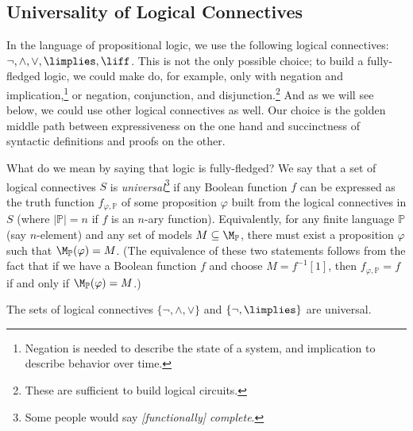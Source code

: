 \subsection{Universality of Logical Connectives}

In the language of propositional logic, we use the following logical connectives: $\neg, \land, \lor, \limplies, \liff$. This is not the only possible choice; to build a fully-fledged logic, we could make do, for example, only with negation and implication,\footnote{Negation is needed to describe the state of a system, and implication to describe behavior over time.} or negation, conjunction, and disjunction.\footnote{These are sufficient to build logical circuits.} And as we will see below, we could use other logical connectives as well. Our choice is the golden middle path between expressiveness on the one hand and succinctness of syntactic definitions and proofs on the other.

What do we mean by saying that logic is fully-fledged? We say that a set of logical connectives $S$ is \emph{universal}\footnote{Some people would say \emph{[functionally] complete}.} if any Boolean function $f$ can be expressed as the truth function $f_{\varphi,\mathbb P}$ of some proposition $\varphi$ built from the logical connectives in $S$ (where $|\mathbb P|=n$ if $f$ is an $n$-ary function). Equivalently, for any finite language $\mathbb P$ (say $n$-element) and any set of models $M \subseteq \M_\mathbb P$, there must exist a proposition $\varphi$ such that $\M_\mathbb P(\varphi) = M$. (The equivalence of these two statements follows from the fact that if we have a Boolean function $f$ and choose $M = f^{-1}[1]$, then $f_{\varphi,\mathbb P} = f$ if and only if $\M_\mathbb P(\varphi) = M$.)

\begin{proposition} \label{proposition:not-and-or-is-universal}
    The sets of logical connectives $\{\neg, \land, \lor\}$ and $\{\neg, \limplies\}$ are universal.
\end{proposition}

